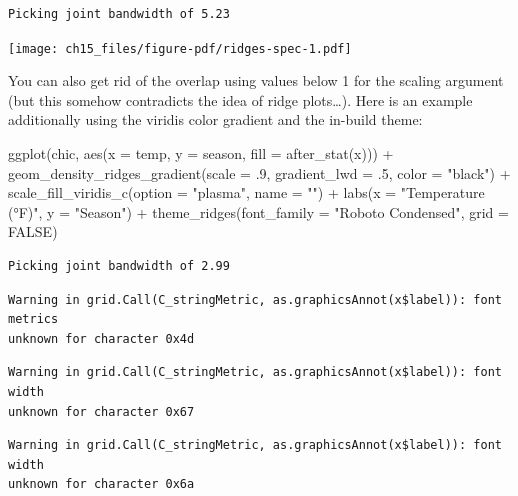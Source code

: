 \documentclass[
  letterpaper,
  DIV=11,
  numbers=noendperiod]{scrreprt}
\newenvironment{Shaded}{\begin{snugshade}}{\end{snugshade}}
\newcommand{\AttributeTok}[1]{\textcolor[rgb]{0.40,0.45,0.13}{#1}}
\newcommand{\ConstantTok}[1]{\textcolor[rgb]{0.56,0.35,0.01}{#1}}
\newcommand{\DecValTok}[1]{\textcolor[rgb]{0.68,0.00,0.00}{#1}}
\newcommand{\FunctionTok}[1]{\textcolor[rgb]{0.28,0.35,0.67}{#1}}
\newcommand{\NormalTok}[1]{\textcolor[rgb]{0.00,0.23,0.31}{#1}}
\newcommand{\SpecialCharTok}[1]{\textcolor[rgb]{0.37,0.37,0.37}{#1}}
\newcommand{\StringTok}[1]{\textcolor[rgb]{0.13,0.47,0.30}{#1}}
\begin{document}
\begin{verbatim}
Picking joint bandwidth of 5.23
\end{verbatim}

\texttt{[image: ch15\_files/figure-pdf/ridges-spec-1.pdf]}

You can also get rid of the overlap using values below 1 for the scaling
argument (but this somehow contradicts the idea of ridge plots\ldots).
Here is an example additionally using the viridis color gradient and the
in-build theme:

\begin{Shaded}
\begin{Highlighting}[]
\FunctionTok{ggplot}\NormalTok{(chic, }\FunctionTok{aes}\NormalTok{(}\AttributeTok{x =}\NormalTok{ temp, }\AttributeTok{y =}\NormalTok{ season, }\AttributeTok{fill =} \FunctionTok{after\_stat}\NormalTok{(x))) }\SpecialCharTok{+}
  \FunctionTok{geom\_density\_ridges\_gradient}\NormalTok{(}\AttributeTok{scale =}\NormalTok{ .}\DecValTok{9}\NormalTok{, }\AttributeTok{gradient\_lwd =}\NormalTok{ .}\DecValTok{5}\NormalTok{,}
                               \AttributeTok{color =} \StringTok{"black"}\NormalTok{) }\SpecialCharTok{+}
  \FunctionTok{scale\_fill\_viridis\_c}\NormalTok{(}\AttributeTok{option =} \StringTok{"plasma"}\NormalTok{, }\AttributeTok{name =} \StringTok{""}\NormalTok{) }\SpecialCharTok{+}
  \FunctionTok{labs}\NormalTok{(}\AttributeTok{x =} \StringTok{"Temperature (°F)"}\NormalTok{, }\AttributeTok{y =} \StringTok{"Season"}\NormalTok{) }\SpecialCharTok{+}
  \FunctionTok{theme\_ridges}\NormalTok{(}\AttributeTok{font\_family =} \StringTok{"Roboto Condensed"}\NormalTok{, }\AttributeTok{grid =} \ConstantTok{FALSE}\NormalTok{)}
\end{Highlighting}
\end{Shaded}

\begin{verbatim}
Picking joint bandwidth of 2.99
\end{verbatim}

\begin{verbatim}
Warning in grid.Call(C_stringMetric, as.graphicsAnnot(x$label)): font metrics
unknown for character 0x4d
\end{verbatim}

\begin{verbatim}
Warning in grid.Call(C_stringMetric, as.graphicsAnnot(x$label)): font width
unknown for character 0x67
\end{verbatim}

\begin{verbatim}
Warning in grid.Call(C_stringMetric, as.graphicsAnnot(x$label)): font width
unknown for character 0x6a
\end{verbatim}
\end{document}
